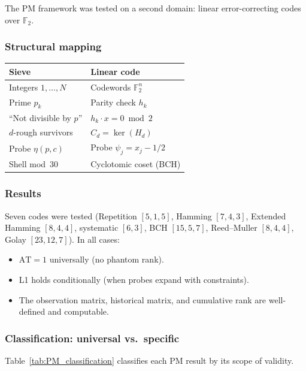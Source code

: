 \documentclass[12pt,a4paper]{article}
\begin{document}
The PM framework was tested on a second domain: linear error-correcting codes
over $\mathbb{F}_2$.

\subsubsection{Structural mapping}

\begin{center}
\begin{tabular}{ll}
\toprule
\textbf{Sieve} & \textbf{Linear code} \\
\midrule
Integers $1, \ldots, N$ & Codewords $\mathbb{F}_2^n$ \\
Prime $p_k$ & Parity check $h_k$ \\
``Not divisible by $p$'' & $h_k \cdot x = 0 \bmod 2$ \\
$d$-rough survivors & $C_d = \ker(H_d)$ \\
Probe $\eta(p, c)$ & Probe $\psi_j = x_j - 1/2$ \\
Shell mod~30 & Cyclotomic coset (BCH) \\
\bottomrule
\end{tabular}
\end{center}

\subsubsection{Results}

Seven codes were tested (Repetition $[5,1,5]$, Hamming $[7,4,3]$, Extended
Hamming $[8,4,4]$, systematic $[6,3]$, BCH $[15,5,7]$, Reed--Muller $[8,4,4]$,
Golay $[23,12,7]$).  In all cases:
\begin{itemize}[nosep]
  \item $\mathrm{AT} = 1$ universally (no phantom rank).
  \item L1 holds conditionally (when probes expand with constraints).
  \item The observation matrix, historical matrix, and cumulative rank are
    well-defined and computable.
\end{itemize}

\subsubsection{Classification: universal vs.\ specific}

Table~\ref{tab:PM_classification} classifies each PM result by its scope of validity.
\end{document}
